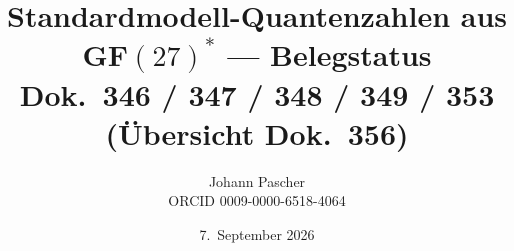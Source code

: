 \documentclass[11pt,a4paper,landscape]{report}
\title{Standardmodell-Quantenzahlen aus GF$(27)^*$ --- Belegstatus\\[0.5em]
  \large Dok.~346 / 347 / 348 / 349 / 353 \quad(Übersicht Dok.~356)}
\date{7.~September 2026}
\author{Johann Pascher\\\small ORCID 0009-0000-6518-4064}
\begin{document}
\renewcommand{\thechapter}{}
\renewcommand{\thesection}{\arabic{section}}
\maketitle
\tableofcontents

\end{document}
